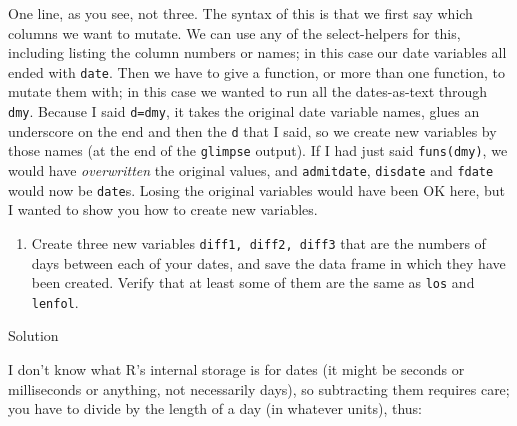 \documentclass[]{tufte-book}
\newenvironment{Shaded}{}{}
\newcommand{\DataTypeTok}[1]{\textcolor[rgb]{0.56,0.13,0.00}{#1}}
\newcommand{\DecValTok}[1]{\textcolor[rgb]{0.25,0.63,0.44}{#1}}
\newcommand{\KeywordTok}[1]{\textcolor[rgb]{0.00,0.44,0.13}{\textbf{#1}}}
\newcommand{\NormalTok}[1]{#1}
\newcommand{\OperatorTok}[1]{\textcolor[rgb]{0.40,0.40,0.40}{#1}}
\newcommand{\StringTok}[1]{\textcolor[rgb]{0.25,0.44,0.63}{#1}}
\providecommand{\tightlist}{%
  \setlength{\itemsep}{0pt}\setlength{\parskip}{0pt}}
\theoremstyle{definition}
\theoremstyle{definition}
\theoremstyle{definition}
\theoremstyle{remark}
\begin{document}
One line, as you see, not three. The syntax of this is that we first say
which columns we want to mutate. We can use any of the select-helpers
for this, including listing the column numbers or names; in this case
our date variables all ended with \texttt{date}. Then we have to give a
function, or more than one function, to mutate them with; in this case
we wanted to run all the dates-as-text through \texttt{dmy}. Because I
said \texttt{d=dmy}, it takes the original date variable names, glues an
underscore on the end and then the \texttt{d} that I said, so we create
new variables by those names (at the end of the \texttt{glimpse}
output). If I had just said \texttt{funs(dmy)}, we would have
\emph{overwritten} the original values, and \texttt{admitdate},
\texttt{disdate} and \texttt{fdate} would now be \texttt{date}s. Losing
the original variables would have been OK here, but I wanted to show you
how to create new variables.

\begin{enumerate}
\def\labelenumi{(\alph{enumi})}
\setcounter{enumi}{2}
\tightlist
\item
  Create three new variables \texttt{diff1,\ diff2,\ diff3} that are the
  numbers of days between each of your dates, and save the data frame in
  which they have been created. Verify that at least some of them are
  the same as \texttt{los} and \texttt{lenfol}.
\end{enumerate}

Solution

I don't know what R's internal storage is for dates (it might be seconds
or milliseconds or anything, not necessarily days), so subtracting them
requires care; you have to divide by the length of a day (in whatever
units), thus:

\begin{Shaded}
\end{Shaded}
\end{document}
